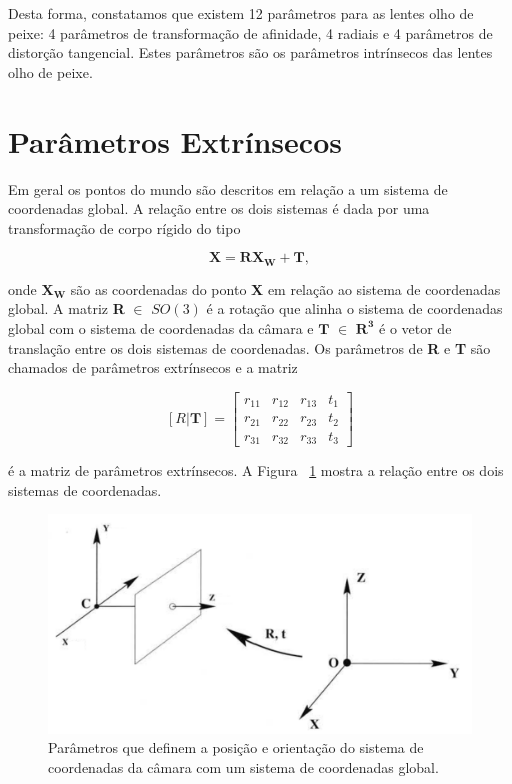 Desta forma, constatamos que existem 12 parâmetros para as lentes olho de peixe: 4 parâmetros de transformação de afinidade, 4 radiais e 4 parâmetros de distorção tangencial. Estes parâmetros são os parâmetros intrínsecos das lentes olho de peixe.




\section{Parâmetros Extrínsecos}

Em geral os pontos do mundo são descritos em relação a um sistema de coordenadas global. A relação entre os dois sistemas é dada por uma transformação de corpo rígido do tipo

\[ \textbf{X} = \textbf{R}\textbf{X}_\textbf{W} + \textbf{T},  \]

onde $\textbf{X}_\textbf{W}$ são as coordenadas do ponto \textbf{X} em relação ao sistema de coordenadas global. A matriz \textbf{R} $\in$ \textit{$SO(3)$} é a rotação que alinha o sistema de coordenadas global com o sistema de coordenadas da câmara e $\textbf{T}$ $\in$ $\mathbf{R^3}$ é o vetor de translação entre os dois sistemas de coordenadas. Os parâmetros de \textbf{R} e \textbf{T} são chamados de parâmetros extrínsecos e a matriz 

\[ [\textit{R}|\textbf{T}] = \left[ \begin{array}{cccc}
r_{11} & r_{12} & r_{13} & t_1 \\ 
r_{21} & r_{22} & r_{23} & t_2 \\ 
r_{31} & r_{32} & r_{33} & t_3
\end{array} \right] \]

é a matriz de parâmetros extrínsecos. A Figura ~\ref{fig:parExt} mostra a relação entre os dois sistemas de coordenadas.

\begin{figure}[h!]
	\centering
	\includegraphics[width=0.7\linewidth]{figures/parExt}
	\caption{Parâmetros que definem a posição e orientação do sistema de coordenadas da câmara com um sistema de coordenadas global.}
	\label{fig:parExt}
\end{figure}



